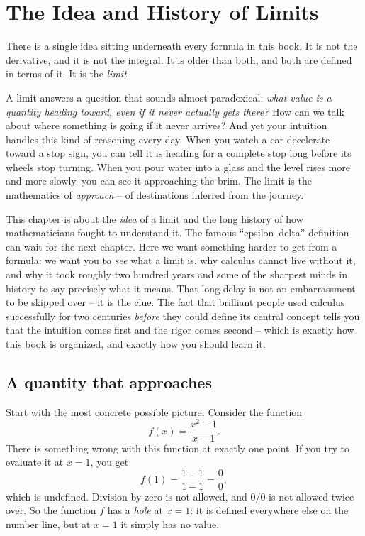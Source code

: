 \chapter{The Idea and History of Limits}

There is a single idea sitting underneath every formula in this book. It is not the
derivative, and it is not the integral. It is older than both, and both are defined in terms
of it. It is the \emph{limit}.

A limit answers a question that sounds almost paradoxical: \emph{what value is a quantity heading
toward, even if it never actually gets there?} How
can we talk about where something is going if it never arrives? And yet your intuition handles
this kind of reasoning every day. When you watch a car decelerate toward a stop sign, you can
tell it is heading for a complete stop long before its wheels stop turning. When you pour
water into a glass and the level rises more and more slowly, you can see it approaching the
brim. The limit is the mathematics of \emph{approach} -- of destinations inferred from the
journey.

This chapter is about the \emph{idea} of a limit and the long history of how
mathematicians fought to understand it. The famous ``epsilon--delta'' definition can wait for
the next chapter. Here we want something
harder to get from a formula: we want you to \emph{see} what a limit is,
why calculus cannot live without it, and why it took roughly two hundred years and some of the
sharpest minds in history to say precisely what it means. That long delay is not an
embarrassment to be skipped over -- it is the clue. The fact that brilliant people used calculus
successfully for two centuries \emph{before} they could define its central concept tells you
that the intuition comes first and the rigor comes second -- which is exactly how this book is
organized, and exactly how you should learn it.

\section{A quantity that approaches}

Start with the most concrete possible picture. Consider the function
\[
  f(x) = \frac{x^2 - 1}{x - 1}.
\]
There is something wrong with this function at exactly one point. If you try to evaluate it at
$x = 1$, you get
\[
  f(1) = \frac{1 - 1}{1 - 1} = \frac{0}{0},
\]
which is undefined. Division by zero is not allowed, and $0/0$ is not allowed twice over. So
the function $f$ has a \emph{hole} at $x = 1$: it is defined everywhere else on the number
line, but at $x = 1$ it simply has no value.

